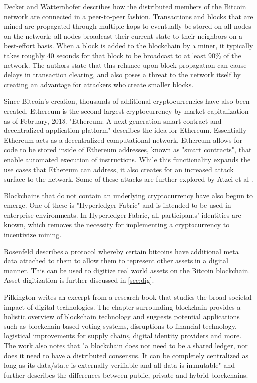 \documentclass[12pt]{report}
\begin{document}
Decker and Watternhofer \cite{Decker.2013} describes how the distributed members of the Bitcoin network are connected in a peer-to-peer fashion. Transactions and blocks that are mined are propagated through multiple hops to eventually be stored on all nodes on the network; all nodes broadcast their current state to their neighbors on a best-effort basis. When a block is added to the blockchain by a miner, it typically takes roughly 40 seconds for that block to be broadcast to at least 90\% of the network. The authors state that this reliance upon block propagation can cause delays in transaction clearing, and also poses a threat to the network itself by creating an advantage for attackers who create smaller blocks.

Since Bitcoin's creation, thousands of additional cryptocurrencies have also been created. Ethereum is the second largest cryptocurrency by market capitalization as of February, 2018. "Ethereum: A next-generation smart contract and decentralized application platform" \cite{Buterin.2014} describes the idea for Ethereum. Essentially Ethereum acts as a decentralized computational network. Ethereum allows for code to be stored inside of Ethereum addresses, known as "smart contracts", that enable automated execution of instructions. While this functionality expands the use cases that Ethereum can address, it also creates for an increased attack surface to the network. Some of these attacks are further explored by Atzei et al \cite{Atzei.2017}.

Blockchains that do not contain an underlying cryptocurrency have also begun to emerge. One of these is "Hyperledger Fabric" \cite{hyperledger.} and is intended to be used in enterprise environments. In Hyperledger Fabric, all participants' identities are known, which removes the necessity for implementing a cryptocurrency to incentivize mining.

Rosenfeld \cite{Rosenfeld.2012} describes a protocol whereby certain bitcoins have additional meta data attached to them to allow them to represent other assets in a digital manner. This can be used to digitize real world assets on the Bitcoin blockchain. Asset digitization is further discussed in \autoref{sec:dig}.

Pilkington \cite{Pilkington.2016} writes an excerpt from a research book that studies the broad societal impact of digital technologies. The chapter surrounding blockchain provides a holistic overview of blockchain technology and suggests potential applications such as blockchain-based voting systems, disruptions to financial technology, logistical improvements for supply chains, digital identity providers and more. The work also notes that "a blockchain does not need to be a shared ledger, nor does it need to have a distributed consensus. It can be completely centralized as long as its data/state is externally verifiable and all data is immutable" and further describes the differences between public, private and hybrid blockchains.
\end{document}
